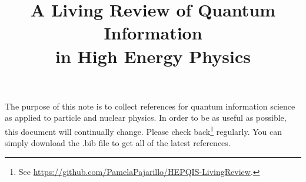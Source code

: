 \documentclass[12pt,letterpaper]{article}
\title{\boldmath A Living Review of Quantum Information \\ in High Energy Physics}
\begin{document}
\maketitle

The purpose of this note is to collect references for quantum information science as applied to particle and nuclear physics.  In order to be as useful as possible, this document will continually change. Please check back\footnote{See \href{https://github.com/PamelaPajarillo/HEPQIS-LivingReview}{https://github.com/PamelaPajarillo/HEPQIS-LivingReview}.} regularly.  You can simply download the .bib file to get all of the latest references. 



\clearpage
\flushbottom
%


\end{document}
